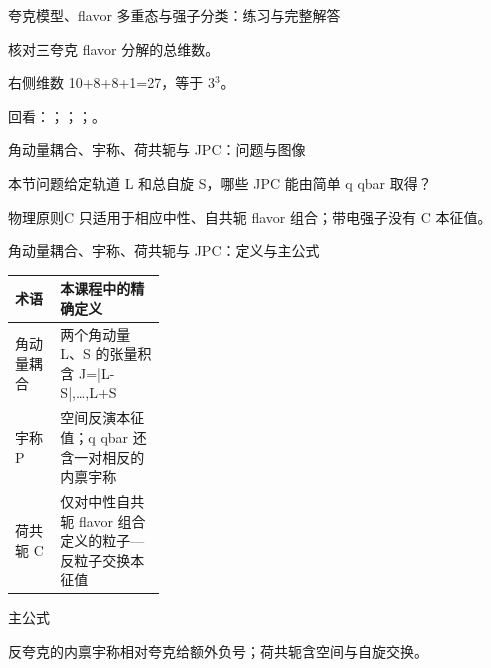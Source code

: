 \begin{frame}[t]{夸克模型、flavor 多重态与强子分类：练习与完整解答}
\footnotesize
\begin{block}{}核对三夸克 flavor 分解的总维数。\end{block}
\begin{exampleblock}{}右侧维数 10+8+8+1=27，等于 3\ensuremath{^{3}}。\end{exampleblock}
\vfill
\scriptsize 回看：；；；。
\end{frame}

\begin{frame}[t]{角动量耦合、宇称、荷共轭与 JPC：问题与图像}
\footnotesize
\begin{block}{本节问题}给定轨道 L 和总自旋 S，哪些 JPC 能由简单 q qbar 取得？\end{block}
\begin{block}{物理原则}\quad C 只适用于相应中性、自共轭 flavor 组合；带电强子没有 C 本征值。\end{block}
\end{frame}

\begin{frame}[t]{角动量耦合、宇称、荷共轭与 JPC：定义与主公式}
\footnotesize\begin{tabularx}{\linewidth}{p{0.30\linewidth}Y}
\toprule 术语 & 本课程中的精确定义\\\midrule
{} 角动量耦合 & 两个角动量 L、S 的张量积含 J=|L-S|,…,L+S\\
 宇称 P & 空间反演本征值；q qbar 还含一对相反的内禀宇称\\
 荷共轭 C & 仅对中性自共轭 flavor 组合定义的粒子—反粒子交换本征值\\
\bottomrule\end{tabularx}\vspace{0.15cm}
\begin{block}{ 主公式}\centering{}\end{block}
反夸克的内禀宇称相对夸克给额外负号；荷共轭含空间与自旋交换。
\end{frame}

